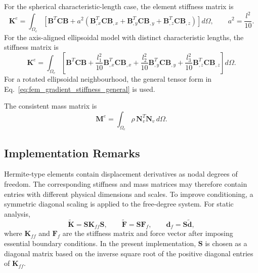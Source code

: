 \documentclass[final,3p,times,fleqn]{elsarticle}
\begin{document}
For the spherical characteristic-length case, the element stiffness matrix is
\begin{equation}
\label{eq:3d_hermite_stiffness_isotropic}
\mathbf{K}^{e}
=
\int_{\Omega_e}
\left[
\mathbf{B}^{T}\mathbf{C}\mathbf{B}
+
a^2
\left(
\mathbf{B}_{,x}^{T}\mathbf{C}\mathbf{B}_{,x}
+
\mathbf{B}_{,y}^{T}\mathbf{C}\mathbf{B}_{,y}
+
\mathbf{B}_{,z}^{T}\mathbf{C}\mathbf{B}_{,z}
\right)
\right]d\Omega,
\qquad
a^2=\frac{l^2}{10}.
\end{equation}
For the axis-aligned ellipsoidal model with distinct characteristic
lengths, the stiffness matrix is
\begin{equation}
\label{eq:3d_hermite_stiffness_anisotropic}
\mathbf{K}^{e}
=
\int_{\Omega_e}
\left[
\mathbf{B}^{T}\mathbf{C}\mathbf{B}
+
\frac{l_1^2}{10}
\mathbf{B}_{,x}^{T}\mathbf{C}\mathbf{B}_{,x}
+
\frac{l_2^2}{10}
\mathbf{B}_{,y}^{T}\mathbf{C}\mathbf{B}_{,y}
+
\frac{l_3^2}{10}
\mathbf{B}_{,z}^{T}\mathbf{C}\mathbf{B}_{,z}
\right]d\Omega .
\end{equation}
For a rotated ellipsoidal neighbourhood, the general tensor form in
Eq.~\eqref{eq:fem_gradient_stiffness_general} is used.

The consistent mass matrix is
\begin{equation}
\label{eq:3d_hermite_mass}
\mathbf{M}^{e}
=
\int_{\Omega_e}
\rho\,\mathbf{N}_v^T\mathbf{N}_v\,d\Omega .
\end{equation}

\subsection{Implementation Remarks}
\label{subsec:fem_implementation_remarks}

Hermite-type elements contain displacement derivatives as nodal degrees
of freedom. The corresponding stiffness and mass matrices may therefore
contain entries with different physical dimensions and scales. To improve
conditioning, a symmetric diagonal scaling is applied to the free-degree
system. For static analysis,
\begin{equation}
\label{eq:diagonal_scaling}
\tilde{\mathbf{K}}
=
\mathbf{S}\mathbf{K}_{ff}\mathbf{S},
\qquad
\tilde{\mathbf{F}}
=
\mathbf{S}\mathbf{F}_{f},
\qquad
\mathbf{d}_{f}
=
\mathbf{S}\tilde{\mathbf{d}},
\end{equation}
where $\mathbf{K}_{ff}$ and $\mathbf{F}_f$ are the stiffness matrix and
force vector after imposing essential boundary conditions. In the present
implementation, $\mathbf{S}$ is chosen as a diagonal matrix based on the
inverse square root of the positive diagonal entries of $\mathbf{K}_{ff}$.
\end{document}
